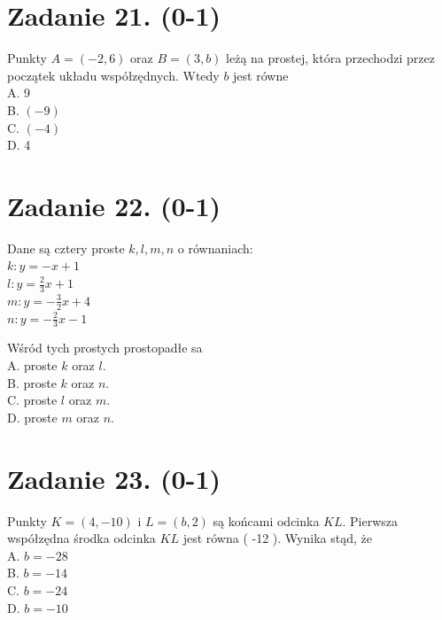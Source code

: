 \documentclass[10pt]{article}
\begin{document}
\section*{Zadanie 21. (0-1)}
Punkty \(A=(-2,6)\) oraz \(B=(3, b)\) leżą na prostej, która przechodzi przez początek układu współzędnych. Wtedy \(b\) jest równe\\
A. 9\\
B. \((-9)\)\\
C. \((-4)\)\\
D. 4

\section*{Zadanie 22. (0-1)}
Dane są cztery proste \(k, l, m, n\) o równaniach:\\
\(k: y=-x+1\)\\
\(l: y=\frac{2}{3} x+1\)\\
\(m: y=-\frac{3}{2} x+4\)\\
\(n: y=-\frac{2}{3} x-1\)

Wśród tych prostych prostopadłe sa\\
A. proste \(k\) oraz \(l\).\\
B. proste \(k\) oraz \(n\).\\
C. proste \(l\) oraz \(m\).\\
D. proste \(m\) oraz \(n\).

\section*{Zadanie 23. (0-1)}
Punkty \(K=(4,-10)\) i \(L=(b, 2)\) są końcami odcinka \(K L\). Pierwsza współzędna środka odcinka \(K L\) jest równa ( -12 ). Wynika stąd, że\\
A. \(b=-28\)\\
B. \(b=-14\)\\
C. \(b=-24\)\\
D. \(b=-10\)
\end{document}

